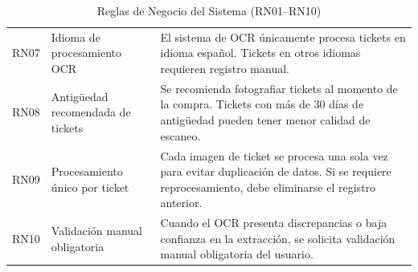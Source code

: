 \begin{table}[H]
\begin{tabularx}{\textwidth}{@{} l l X @{}}
RN07 & Idioma de procesamiento OCR &
El sistema de OCR únicamente procesa tickets en idioma español. Tickets en otros idiomas requieren registro manual. \\

RN08 & Antigüedad recomendada de tickets &
Se recomienda fotografiar tickets al momento de la compra. Tickets con más de 30 días de antigüedad pueden tener menor calidad de escaneo. \\

RN09 & Procesamiento único por ticket &
Cada imagen de ticket se procesa una sola vez para evitar duplicación de datos. Si se requiere reprocesamiento, debe eliminarse el registro anterior. \\

RN10 & Validación manual obligatoria &
Cuando el OCR presenta discrepancias o baja confianza en la extracción, se solicita validación manual obligatoria del usuario. \\

\bottomrule
\end{tabularx}
\caption{Reglas de Negocio del Sistema (RN01–RN10)}
\end{table}


